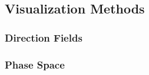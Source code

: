 


%







\subsection{Visualization Methods}

\subsubsection{Direction Fields}


\subsubsection{Phase Space}





